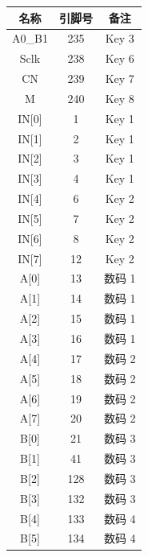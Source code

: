 \begin{enumerate}
    \begin{table}[H]
        \centering
        \begin{tabular}{|c|c|c|}
            \hline
            名称 & 引脚号 & 备注 \\
            \hline
            A0\_B1 & 235 & Key 3 \\
            \hline
            Sclk & 238 & Key 6 \\
            \hline
            CN & 239 & Key 7 \\
            \hline
            M & 240 & Key 8 \\
            \hline
            IN[0] & 1 & Key 1 \\
            \hline
            IN[1] & 2 & Key 1 \\
            \hline
            IN[2] & 3 & Key 1 \\
            \hline
            IN[3] & 4 & Key 1 \\
            \hline
            IN[4] & 6 & Key 2 \\
            \hline
            IN[5] & 7 & Key 2 \\
            \hline
            IN[6] & 8 & Key 2 \\
            \hline
            IN[7] & 12 & Key 2 \\
            \hline
            A[0] & 13 & 数码 1 \\
            \hline
            A[1] & 14 & 数码 1 \\
            \hline
            A[2] & 15 & 数码 1 \\
            \hline
            A[3] & 16 & 数码 1 \\
            \hline
            A[4] & 17 & 数码 2 \\
            \hline
            A[5] & 18 & 数码 2 \\
            \hline
            A[6] & 19 & 数码 2 \\
            \hline
            A[7] & 20 & 数码 2 \\
            \hline
            B[0] & 21 & 数码 3 \\
            \hline
            B[1] & 41 & 数码 3 \\
            \hline
            B[2] & 128 & 数码 3 \\
            \hline
            B[3] & 132 & 数码 3 \\
            \hline
            B[4] & 133 & 数码 4 \\
            \hline
            B[5] & 134 & 数码 4 \\

\end{tabular}
\end{table}
\end{enumerate}
